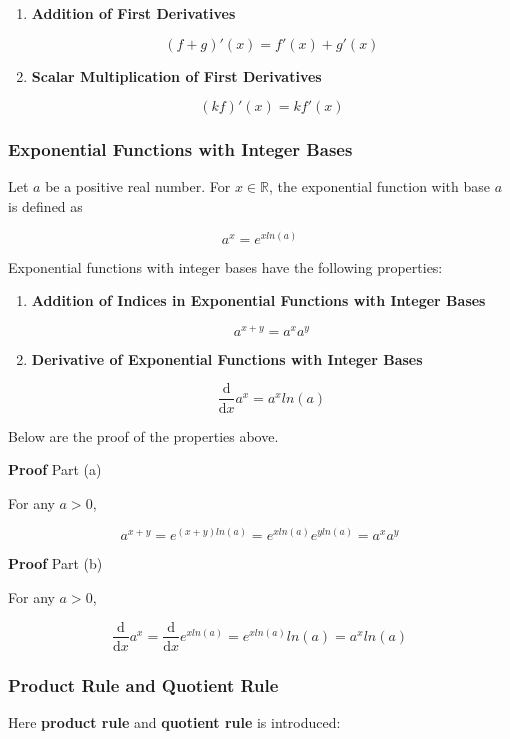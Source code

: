 \documentclass[a4paper,12pt]{article}
\newcommand{\s}{\vspace{1mm}}
\newcommand{\n}{\vspace{3mm}}
\newcommand{\R}{\mathbb{R}}
\newcommand{\diff}{\mathrm{d}}
\newenvironment{block}[4][Block]{ %
\begin{list}{}{
  \setlength{\leftmargin}{0mm}
  \setlength{\rightmargin}{0mm}
  \setlength{\topsep}{0mm}
  \setlength{\partopsep}{0mm}
  \parsep\parskip
  \setlength{\itemsep}{-\parsep}
  }
  \needspace{\baselineskip}
  \item \textbf{#2 #3} \hspace{1mm} #4
  \vspace{1mm}
  \item
  }
{
\end{list}
}
\newenvironment{alist}{ %
\begin{enumerate}[label=(\alph*)]
}{
\end{enumerate}
}
\begin{document}
\begin{alist}
  \item \textbf{Addition of First Derivatives}

  $$(f+g)'(x)=f'(x)+g'(x)$$

  \item \textbf{Scalar Multiplication of First Derivatives}

  $$(kf)'(x)=kf'(x)$$
\end{alist}

\subsubsection{Exponential Functions with Integer Bases}
Let $a$ be a positive real number. For $x\in \R$, the exponential function with base $a$ is defined as

$$a^{x}=e^{xln(a)}$$\s

Exponential functions with integer bases have the following properties:

\begin{alist}
  \item \textbf{Addition of Indices in Exponential Functions with Integer Bases}

  $$a^{x+y}=a^{x}a^{y}$$

  \item \textbf{Derivative of Exponential Functions with Integer Bases}

  $$\frac{\diff }{\diff  x}a^{x}=a^{x}ln(a)$$
\end{alist}

Below are the proof of the properties above.\n

\begin{block}{Proof}{}{Part (a)}
  For any $a>0$,

  $$a^{x+y}=e^{(x+y)ln(a)}=e^{xln(a)}e^{yln(a)}=a^{x}a^{y}$$
\end{block}\n

\begin{block}{Proof}{}{Part (b)}
  For any $a>0$,

  $$\frac{\diff }{\diff  x}a^{x}=\frac{\diff }{\diff  x}e^{xln(a)}=e^{xln(a)}ln(a)=a^{x}ln(a)$$
\end{block}

\subsubsection{Product Rule and Quotient Rule}
Here \textbf{product rule} and \textbf{quotient rule} is introduced:\n
\end{document}
